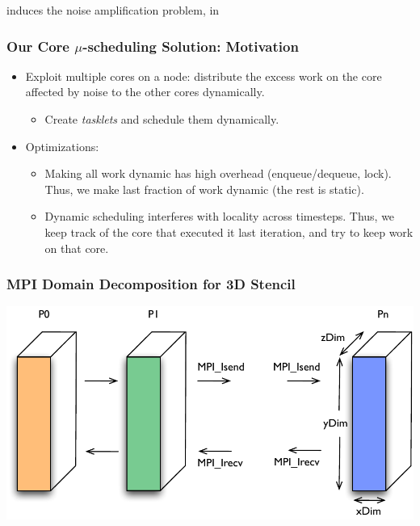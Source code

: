 induces the {noise amplification problem}, in 

\begin{frame}
\frametitle{Our Core $\mu$-scheduling Solution: Motivation} 
\begin{itemize}
\item Exploit multiple cores on a node: distribute the excess work on 
the core affected by noise to the other cores dynamically. 
\begin{itemize}
\item {\small Create \textit{tasklets} and schedule them dynamically.} 
\end{itemize} 
\item Optimizations: 
\begin{itemize}
\item {\small Making all work dynamic has high overhead
 (enqueue/dequeue, lock). Thus, we make last fraction 
of work dynamic (the rest is static).}
\item {\small Dynamic scheduling interferes with locality across timesteps.
Thus, we keep track of the core that executed it last iteration, and try to keep work on that core. }
\end{itemize} 
\end{itemize}
\end{frame} 

\begin{frame}
\frametitle{MPI Domain Decomposition for 3D Stencil} 
\includegraphics[width=\textwidth]{images/mpi_decomp}
\end{frame} 


